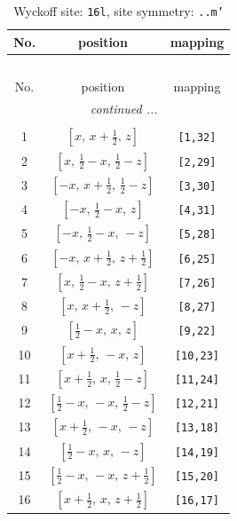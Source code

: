 \documentclass[fleqn,8pt]{jsarticle}
\begin{document}
\renewcommand{\arraystretch}{1.2}
\begin{longtable}{ccc}
\caption{Wyckoff site: {\tt 16l}, site symmetry: {\tt ..m'}}
 \\
 \hline \hline
No. & position & mapping \\ \hline \endfirsthead

\multicolumn{2}{l}{\tablename\ \thetable{}} \\
 \hline \hline
No. & position & mapping \\ \hline \endhead

 \hline \hline
\multicolumn{2}{r}{\footnotesize\it continued ...} \\ \endfoot

 \hline \hline
\multicolumn{2}{r}{} \\ \endlastfoot

1 & $\left[ x,\, x + \frac{1}{2},\, z \right]$ & {\tt [1,32]} \\ \hline
2 & $\left[ x,\, \frac{1}{2} - x,\, \frac{1}{2} - z \right]$ & {\tt [2,29]} \\ \hline
3 & $\left[ - x,\, x + \frac{1}{2},\, \frac{1}{2} - z \right]$ & {\tt [3,30]} \\ \hline
4 & $\left[ - x,\, \frac{1}{2} - x,\, z \right]$ & {\tt [4,31]} \\ \hline
5 & $\left[ - x,\, \frac{1}{2} - x,\, - z \right]$ & {\tt [5,28]} \\ \hline
6 & $\left[ - x,\, x + \frac{1}{2},\, z + \frac{1}{2} \right]$ & {\tt [6,25]} \\ \hline
7 & $\left[ x,\, \frac{1}{2} - x,\, z + \frac{1}{2} \right]$ & {\tt [7,26]} \\ \hline
8 & $\left[ x,\, x + \frac{1}{2},\, - z \right]$ & {\tt [8,27]} \\ \hline
9 & $\left[ \frac{1}{2} - x,\, x,\, z \right]$ & {\tt [9,22]} \\ \hline
10 & $\left[ x + \frac{1}{2},\, - x,\, z \right]$ & {\tt [10,23]} \\ \hline
11 & $\left[ x + \frac{1}{2},\, x,\, \frac{1}{2} - z \right]$ & {\tt [11,24]} \\ \hline
12 & $\left[ \frac{1}{2} - x,\, - x,\, \frac{1}{2} - z \right]$ & {\tt [12,21]} \\ \hline
13 & $\left[ x + \frac{1}{2},\, - x,\, - z \right]$ & {\tt [13,18]} \\ \hline
14 & $\left[ \frac{1}{2} - x,\, x,\, - z \right]$ & {\tt [14,19]} \\ \hline
15 & $\left[ \frac{1}{2} - x,\, - x,\, z + \frac{1}{2} \right]$ & {\tt [15,20]} \\ \hline
16 & $\left[ x + \frac{1}{2},\, x,\, z + \frac{1}{2} \right]$ & {\tt [16,17]} \\
\end{longtable}
\end{document}
